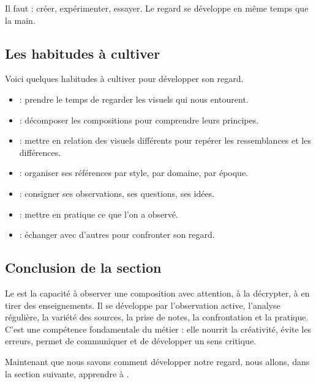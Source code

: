 Il faut  : créer, expérimenter, essayer. Le regard se développe en même temps que la main.

\subsection{Les habitudes à cultiver}

Voici quelques habitudes à cultiver pour développer son regard.

\begin{itemize}
    \item {} : prendre le temps de regarder les visuels qui nous entourent.
    \item {} : décomposer les compositions pour comprendre leurs principes.
    \item {} : mettre en relation des visuels différents pour repérer les ressemblances et les différences.
    \item {} : organiser ses références par style, par domaine, par époque.
    \item {} : consigner ses observations, ses questions, ses idées.
    \item {} : mettre en pratique ce que l'on a observé.
    \item {} : échanger avec d'autres pour confronter son regard.
\end{itemize}

\subsection*{Conclusion de la section}

\begin{retenir}
Le  est la capacité à observer une composition avec attention, à la décrypter, à en tirer des enseignements. Il se développe par l'observation active, l'analyse régulière, la variété des sources, la prise de notes, la confrontation et la pratique. C'est une compétence fondamentale du métier : elle nourrit la créativité, évite les erreurs, permet de communiquer et de développer un sens critique.
\end{retenir}

Maintenant que nous savons comment développer notre regard, nous allons, dans la section suivante, apprendre à .

